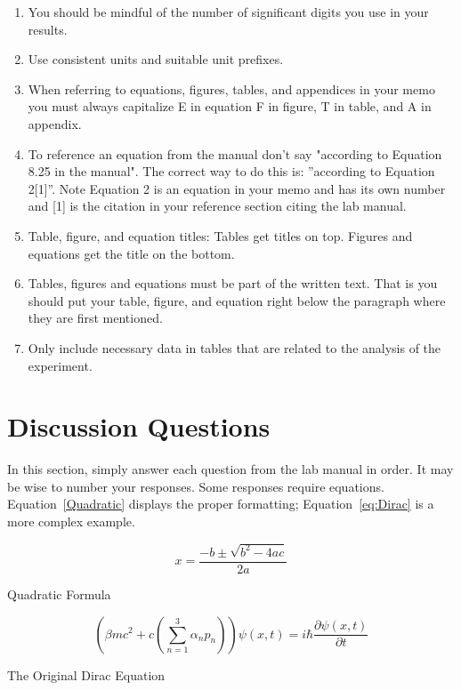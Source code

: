 \documentclass[11pt,a4paper]{article}
\begin{document}
\begin{enumerate} %
  \item You should be mindful of the number of significant digits you use in your results.
  \item Use consistent units and suitable unit prefixes.
  \item When referring to equations, figures, tables, and appendices in your memo you must always capitalize E in equation F in figure, T in table, and A in appendix.
  \item To reference an equation from the manual don't say "according to Equation 8.25 in the manual". The correct way to do this is: ”according to Equation 2[1]”. Note Equation 2 is an equation in your memo and has its own number and [1] is the citation in your reference section citing the lab manual.
  \item Table, figure, and equation titles: Tables get titles on top. Figures and equations get the title on the bottom.
  \item Tables, figures and equations must be part of the written text. That is you should put your table, figure, and equation right below the paragraph where they are first mentioned.
  \item Only include necessary data in tables that are related to the analysis of the experiment.
\end{enumerate}

\section*{Discussion Questions}
In this section, simply answer each question from the lab manual in order. It may be wise to number your responses. Some responses require equations. Equation~\ref{Quadratic} displays the proper formatting; Equation~\ref{eq:Dirac} is a more complex example.

\begin{eqfloat}[!htb]
\begin{equation*}
x=\frac{-b\pm\sqrt{b^2-4ac}}{2a}
\end{equation*}
\caption{Quadratic Formula}\label{Quadratic}
\end{eqfloat}
	
\begin{eqfloat}
\begin{equation*}
\left (
    \beta mc^2 + c 
       \left ( 
           \sum_{n=1}^3 \alpha_n p_n 
       \right )
\right )
\psi(x,t)
=
i \hbar \dfrac{\partial \psi(x,t) }{\partial t}
\end{equation*}
\caption{The Original Dirac Equation}\label{eq:Dirac}
\end{eqfloat}
\end{document}
